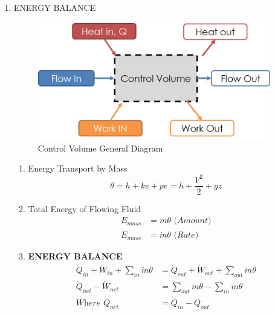 \documentclass{article}
\begin{document}
\begin{enumerate}
    \item{ENERGY BALANCE}\\
    \begin{figure}[h!]
        \centering
        \includegraphics[width=4in]{CV_DIAGRAM.jpg}
        \caption{Control Volume General Diagram}
        \label{cvdiagram}
    \end{figure}
    \begin{enumerate}
        \item{Energy Transport by Mass}
            \begin{equation}
                \theta  = h + ke + pe = h + \frac{V^2}{2} + gz
            \end{equation}
        \item{Total Energy of Flowing Fluid}
            \begin{equation}
                \begin{aligned}
                    E_{mass}        &= m\theta      \textit{  (Amount)}\\
                    \dot{E}_{mass}  &=\dot{m}\theta  \textit{ (Rate)}
                \end{aligned}
            \end{equation}
        \item{\bf ENERGY BALANCE}\\
        \begin{equation}\label{ebalance}
            \begin{aligned}
                \dot{Q}_{in} + \dot{W}_{in} + \sum_{in}\dot{m}\theta &= \dot{Q}_{out} + \dot{W}_{out} + \sum_{out}\dot{m}\theta\\
                \dot{Q}_{net} -  \dot{W}_{net} &= \sum_{out}\dot{m}\theta-\sum_{in}\dot{m}\theta\\
                \textit{Where    }  \dot{Q}_{net} &= \dot{Q}_{in} - \dot{Q}_{out}\\

\end{aligned}
\end{equation}
\end{enumerate}
\end{enumerate}
\end{document}
